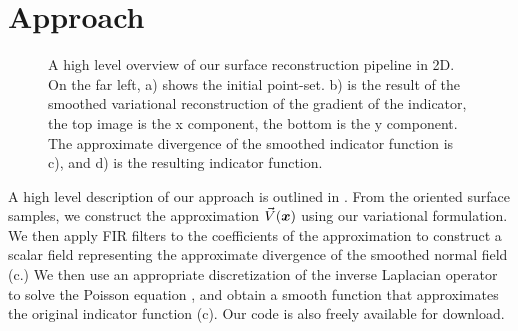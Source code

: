 \section{Approach}
\label{sec:pipeline}
\begin{figure*} 
	\centering
	
	\caption{A high level overview of our surface reconstruction pipeline in 2D. On the far left, a) shows the initial point-set. b) is the result of the smoothed variational reconstruction of the gradient of the indicator, the top image is the x component, the bottom is the y component. The approximate divergence of the smoothed indicator function is c), and d) is the resulting indicator function. }
	\label{fig:pipeline}
\end{figure*}

A high level description of our approach is outlined in . From the oriented surface samples, we construct the approximation $\vec{V}(\boldsymbol{x})$ using our variational formulation. We then apply FIR filters to the coefficients of the approximation to construct a scalar field representing the approximate divergence of the smoothed normal field (c.) We then use an appropriate discretization of the inverse Laplacian operator to solve the Poisson equation , and obtain a smooth function that approximates the original indicator function (c). Our code is also freely available for download.


